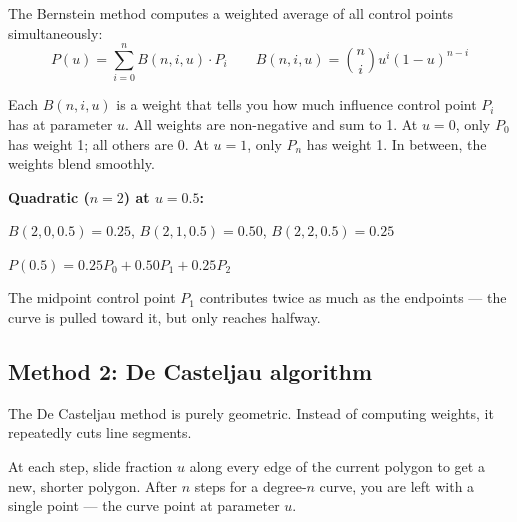 \documentclass[12pt, a4paper]{article}
\begin{document}
The Bernstein method computes a weighted average of all
control points simultaneously:
\[
  P(u) = \sum_{i=0}^{n} B(n, i, u) \cdot P_i
  \qquad
  B(n, i, u) = \binom{n}{i} u^i (1-u)^{n-i}
\]

Each $B(n, i, u)$ is a weight that tells you how much
influence control point $P_i$ has at parameter $u$.
All weights are non-negative and sum to 1.
At $u = 0$, only $P_0$ has weight 1; all others are 0.
At $u = 1$, only $P_n$ has weight 1.
In between, the weights blend smoothly.

\begin{examplebox}
\textbf{Quadratic ($n=2$) at $u=0.5$:}

$B(2,0,0.5) = 0.25$, \quad
$B(2,1,0.5) = 0.50$, \quad
$B(2,2,0.5) = 0.25$

$P(0.5) = 0.25 P_0 + 0.50 P_1 + 0.25 P_2$

The midpoint control point $P_1$ contributes twice as
much as the endpoints --- the curve is pulled toward
it, but only reaches halfway.
\end{examplebox}

\subsection{Method 2: De Casteljau algorithm}

The De Casteljau method is purely geometric.
Instead of computing weights, it repeatedly cuts line
segments.

At each step, slide fraction $u$ along every edge of
the current polygon to get a new, shorter polygon.
After $n$ steps for a degree-$n$ curve, you are left
with a single point --- the curve point at parameter $u$.
\end{document}
